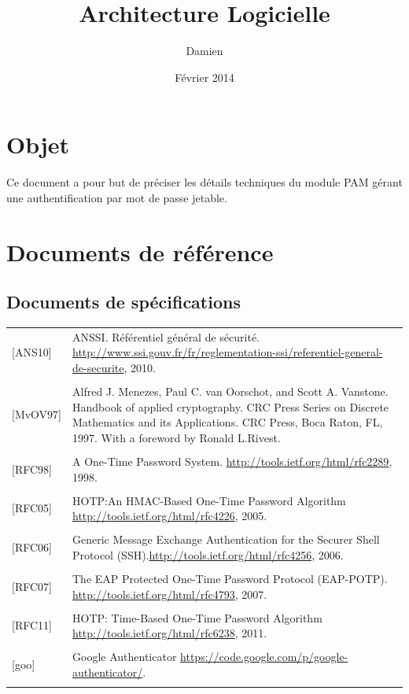 \documentclass{"../../res/univ-projet"}
\title{Architecture Logicielle}
\author{Damien \bsc{Picard}}
\date{Février 2014}
\begin{document}
\maketitle
\section{Objet}
Ce document a pour but de préciser les détails techniques du module PAM gérant une authentification
par mot de passe jetable.

\section{Documents de référence}
\subsection{Documents de spécifications}
\begin{tabular}{p{}>{\raggedright\arraybackslash}p{13cm}}
{[ANS10]} & {ANSSI. Référentiel général de sécurité. \href{http://www.ssi.gouv.fr/fr/reglementation-ssi/referentiel-general-de-securite}{http://www.ssi.gouv.fr/fr/reglementation-ssi/referentiel-general-de-securite}, 2010.}
\tabularnewline
\\
{[MvOV97]} & {Alfred J. Menezes, Paul C. van Oorschot, and Scott A. Vanstone. Handbook of applied cryptography. CRC Press Series on Discrete Mathematics and its Applications. CRC Press, Boca Raton, FL, 1997. With a foreword by Ronald L.Rivest.}
\tabularnewline
\\
{[RFC98]} & {A One-Time Password System. \href{http://tools.ietf.org/html/rfc2289}{http://tools.ietf.org/html/rfc2289}, 1998.}
\tabularnewline
\\
{[RFC05]} & {HOTP:An HMAC-Based One-Time Password Algorithm \href{http://tools.ietf.org/html/rfc4226}{http://tools.ietf.org/html/rfc4226}, 2005.}
\tabularnewline
\\
{[RFC06]} & {Generic Message Exchange Authentication for the Securer Shell Protocol (SSH).\href{http://tools.ietf.org/html/rfc4256}{http://tools.ietf.org/html/rfc4256}, 2006.}
\tabularnewline
\\
{[RFC07]} & {The EAP Protected One-Time Password Protocol (EAP-POTP). \href{http://tools.ietf.org/html/rfc4793}{http://tools.ietf.org/html/rfc4793}, 2007.}
\tabularnewline
\\
{[RFC11]} & {HOTP: Time-Based One-Time Password Algorithm \href{http://tools.ietf.org/html/rfc6238}{http://tools.ietf.org/html/rfc6238}, 2011.}
\tabularnewline
\\
{[goo]} & {Google Authenticator \href{https://code.google.com/p/google-authenticator/}{https://code.google.com/p/google-authenticator/}.}
\tabularnewline
\\
\end{tabular}
\end{document}
